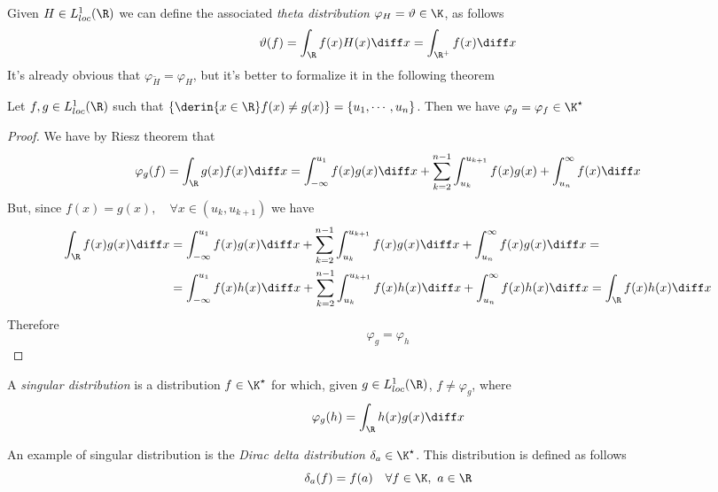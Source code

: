 \documentclass[../mmf.tex]{subfiles}
\begin{document}
\begin{eg}
	Given $H\in L^1_{loc}(\R)$ we can define the associated \textit{theta distribution} $\varphi_H=\vartheta\in\K$, as follows
	\begin{equation*}
		\vartheta(f)=\int_{\R}^{}f(x)H(x)\diff x=\int_{\R^+}^{}f(x)\diff x
	\end{equation*}
	It's already obvious that $\varphi_{\tilde{H}}=\varphi_H$, but it's better to formalize it in the following theorem
\end{eg}
\begin{thm}
	Let $f,g\in L^1_{loc}(\R)$ such that $\left\{ \derin{x\in\R}f(x)\ne g(x) \right\}=\left\{ u_1,\cdots,u_n \right\}$. Then we have $\varphi_g=\varphi_f\in\K^\star$
\end{thm}
\begin{proof}
	We have by Riesz theorem that
	\begin{equation*}
		\varphi_g(f)=\int_{\R}^{}g(x)f(x)\diff x=\int_{-\infty}^{u_1}f(x)g(x)\diff x+\sum_{k=2}^{n-1}\int_{u_k}^{u_{k+1}}f(x)g(x)+\int_{u_n}^\infty f(x)\diff x
	\end{equation*}
	But, since $f(x)=g(x),\quad\forall x\in(u_k,u_{k+1})$ we have
	\begin{equation*}
		\begin{aligned}
			\int_{\R}f(x)g(x)\diff x&=\int_{-\infty}^{u_1}f(x)g(x)\diff x+\sum_{k=2}^{n-1}\int_{u_k}^{u_{k+1}}f(x)g(x)\diff x+\int_{u_n}^{\infty}f(x)g(x)\diff x=\\
			&=\int_{-\infty}^{u_1}f(x)h(x)\diff x+\sum_{k=2}^{n-1}\int_{u_k}^{u_{k+1}}f(x)h(x)\diff x+\int_{u_n}^{\infty}f(x)h(x)\diff x=\int_{\R}^{}f(x)h(x)\diff x
		\end{aligned}
	\end{equation*}
	Therefore
	\begin{equation*}
		\varphi_g=\varphi_h
	\end{equation*}
\end{proof}
\begin{dfn}
	A \textit{singular distribution} is a distribution $f\in\K^\star$ for which, given $g\in L^1_{loc}(\R)$, $f\ne\varphi_g$, where
	\begin{equation*}
		\varphi_g(h)=\int_{\R}^{}h(x)g(x)\diff x
	\end{equation*}
\end{dfn}
\begin{dfn}
	An example of singular distribution is the \textit{Dirac delta distribution} $\delta_a\in\K^\star$. This distribution is defined as follows
	\begin{equation*}
		\delta_a(f)=f(a)\quad\forall f\in\K,\ a\in\R
	\end{equation*}
\end{dfn}
\end{document}
